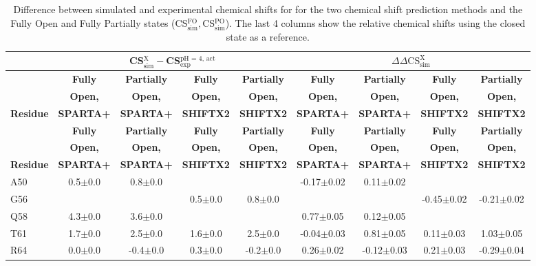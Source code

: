 \documentclass[%
 aip,
 amsmath,amssymb,
 preprint,%
]{revtex4-1}
\newcommand{\ca}{\ce{C_\alpha} }
\begin{document}
\begingroup
\begin{center}
\begin{longtable}{l|c|c|c|c|c|c|c|c}
\caption{\scriptsize Difference between simulated and experimental chemical shifts for \ca for the two chemical shift prediction methods and the Fully Open and Fully Partially states (CS$_\text{sim}^\text{FO}, $CS$_\text{sim}^\text{PO}$). The last 4 columns show the relative chemical shifts using the closed state as a reference.  \label{SI_tb_DDCS_CA}}\\ 
\hline 
\hline 
& \multicolumn{4}{c|}{ CS$_\text{sim}^\text{X}-$CS$_\text{exp}^\text{pH = 4, act}$} & \multicolumn{4}{c}{ $\Delta\Delta\text{CS}_\text{sim}^\text{X}$} \\
\hline
& \textbf{Fully} & \textbf{Partially} & \textbf{Fully} & \textbf{Partially} & \textbf{Fully} & \textbf{Partially} & \textbf{Fully} & \textbf{Partially} \\
& \textbf{Open,} & \textbf{Open,} & \textbf{Open,} & \textbf{Open,} & \textbf{Open,} & \textbf{Open,} & \textbf{Open,} & \textbf{Open,}\\
\textbf{Residue} & \textbf{SPARTA+} & \textbf{SPARTA+} & \textbf{SHIFTX2} & \textbf{SHIFTX2} & \textbf{SPARTA+} & \textbf{SPARTA+} & \textbf{SHIFTX2} & \textbf{SHIFTX2} \\
\hline
\endfirsthead 
\hline
& \textbf{Fully} & \textbf{Partially} & \textbf{Fully} & \textbf{Partially} & \textbf{Fully} & \textbf{Partially} & \textbf{Fully} & \textbf{Partially} \\
& \textbf{Open,} & \textbf{Open,} & \textbf{Open,} & \textbf{Open,} & \textbf{Open,} & \textbf{Open,} & \textbf{Open,} & \textbf{Open,}\\
\textbf{Residue} & \textbf{SPARTA+} & \textbf{SPARTA+} & \textbf{SHIFTX2} & \textbf{SHIFTX2} & \textbf{SPARTA+} & \textbf{SPARTA+} & \textbf{SHIFTX2} & \textbf{SHIFTX2}  \\ \hline
\endhead
A50 & 0.5$\pm$0.0 & 0.8$\pm$0.0 & & & -0.17$\pm$0.02 & 0.11$\pm$0.02 & & \\
G56 & & & 0.5$\pm$0.0 & 0.8$\pm$0.0 & & & -0.45$\pm$0.02 & -0.21$\pm$0.02 \\
Q58 & 4.3$\pm$0.0 & 3.6$\pm$0.0 & & & 0.77$\pm$0.05 & 0.12$\pm$0.05 & & \\
T61 & 1.7$\pm$0.0 & 2.5$\pm$0.0 & 1.6$\pm$0.0 & 2.5$\pm$0.0 & -0.04$\pm$0.03 & 0.81$\pm$0.05 & 0.11$\pm$0.03 & 1.03$\pm$0.05 \\
R64 & 0.0$\pm$0.0 & -0.4$\pm$0.0 & 0.3$\pm$0.0 & -0.2$\pm$0.0 & 0.26$\pm$0.02 & -0.12$\pm$0.03 & 0.21$\pm$0.03 & -0.29$\pm$0.04 \\

\end{longtable}
\end{center}
\end{document}
